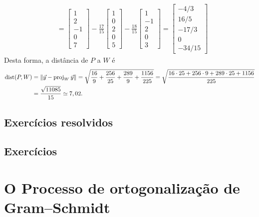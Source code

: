 \documentclass[../livro.tex]{subfiles}  %
\begin{document}
\begin{example}
\begin{equation}
\begin{split}
   & = \begin{bmatrix}
1 \\ 2 \\ -1 \\ 0 \\ 7
\end{bmatrix} - \frac{17}{15}
\begin{bmatrix}
1 \\ 0 \\ 2 \\ 0 \\ 5
\end{bmatrix} - \frac{18}{15}
\begin{bmatrix}
1 \\ -1 \\ 2 \\ 0 \\ 3
\end{bmatrix} =
\begin{bmatrix}
-4/3 \\ 16/5 \\ -17/3 \\ 0 \\ -34/15
\end{bmatrix}
\end{split}
\end{equation} Desta forma, a distância de $P$ a $W$ é
\begin{equation}
\begin{split}
\operatorname{dist} (P,W) & = \|\vec{y} - \operatorname{proj}_{W} \vec{y}\| = \sqrt{\frac{16}{9} + \frac{256}{25} + \frac{289}{9} + \frac{1156}{225}} = \sqrt{\frac{ 16\cdot 25 + 256\cdot 9 + 289 \cdot 25 + 1156}{225}} \\
           & = \frac{ \sqrt{11085} }{15} \simeq 7,02.
\end{split}
\end{equation}
\end{example}


\subsection*{Exercícios resolvidos}

\construirExeresol

\subsection*{Exercícios}

\construirExer


\section{O Processo de ortogonalização de Gram--Schmidt}
\end{document}
